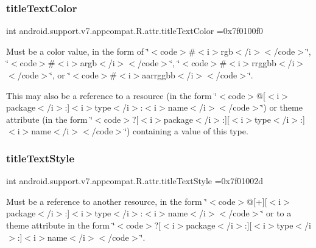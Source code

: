 \subsubsection{\texorpdfstring{title\+Text\+Color}{titleTextColor}}
{\footnotesize\ttfamily int android.\+support.\+v7.\+appcompat.\+R.\+attr.\+title\+Text\+Color =0x7f0100f0\hspace{0.3cm}{\ttfamily [static]}}

Must be a color value, in the form of \char`\"{}$<$code$>$\#$<$i$>$rgb$<$/i$>$$<$/code$>$\char`\"{}, \char`\"{}$<$code$>$\#$<$i$>$argb$<$/i$>$$<$/code$>$\char`\"{}, \char`\"{}$<$code$>$\#$<$i$>$rrggbb$<$/i$>$$<$/code$>$\char`\"{}, or \char`\"{}$<$code$>$\#$<$i$>$aarrggbb$<$/i$>$$<$/code$>$\char`\"{}. 

This may also be a reference to a resource (in the form \char`\"{}$<$code$>$@\mbox{[}$<$i$>$package$<$/i$>$\+:\mbox{]}$<$i$>$type$<$/i$>$\+:$<$i$>$name$<$/i$>$$<$/code$>$\char`\"{}) or theme attribute (in the form \char`\"{}$<$code$>$?\mbox{[}$<$i$>$package$<$/i$>$\+:\mbox{]}\mbox{[}$<$i$>$type$<$/i$>$\+:\mbox{]}$<$i$>$name$<$/i$>$$<$/code$>$\char`\"{}) containing a value of this type. \mbox{\label{classandroid_1_1support_1_1v7_1_1appcompat_1_1R_1_1attr_a736fcf06e75745b6eb862450e360d947}} 
\subsubsection{\texorpdfstring{title\+Text\+Style}{titleTextStyle}}
{\footnotesize\ttfamily int android.\+support.\+v7.\+appcompat.\+R.\+attr.\+title\+Text\+Style =0x7f01002d\hspace{0.3cm}{\ttfamily [static]}}

Must be a reference to another resource, in the form \char`\"{}$<$code$>$@\mbox{[}+\mbox{]}\mbox{[}$<$i$>$package$<$/i$>$\+:\mbox{]}$<$i$>$type$<$/i$>$\+:$<$i$>$name$<$/i$>$$<$/code$>$\char`\"{} or to a theme attribute in the form \char`\"{}$<$code$>$?\mbox{[}$<$i$>$package$<$/i$>$\+:\mbox{]}\mbox{[}$<$i$>$type$<$/i$>$\+:\mbox{]}$<$i$>$name$<$/i$>$$<$/code$>$\char`\"{}. \mbox{\label{classandroid_1_1support_1_1v7_1_1appcompat_1_1R_1_1attr_a4105f4e74aea7a62a41e49f62c057c62}} 

